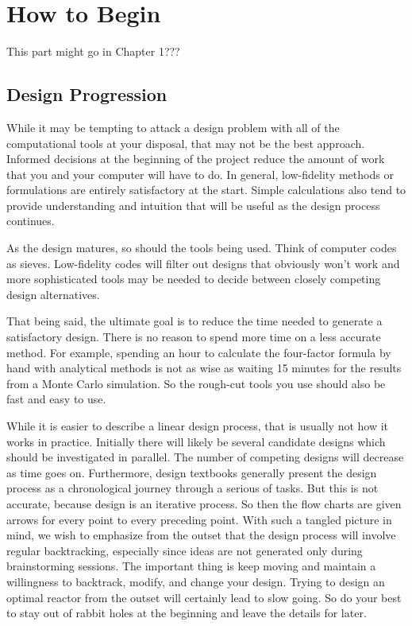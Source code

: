 \chapter{How to Begin}
This part might go in Chapter 1???

\section{Design Progression}
While it may be tempting to attack a design problem with all of the computational tools at your disposal, that may not be the best approach. Informed decisions at the beginning of the project reduce the amount of work that you and your computer will have to do. 
In general, low-fidelity methods or formulations are entirely satisfactory at the start. Simple calculations also tend to provide understanding and intuition that will be useful as the design process continues.

As the design matures, so should the tools being used. Think of computer codes as sieves. Low-fidelity codes will filter out designs that obviously won't work and more sophisticated tools may be needed to decide between closely competing design alternatives.

That being said, the ultimate goal is to reduce the time needed to generate a satisfactory design. There is no reason to spend more time on a less accurate method. For example, spending an hour to calculate the four-factor formula by hand with analytical methods is not as wise as waiting 15 minutes for the results from a Monte Carlo simulation. So the rough-cut tools you use should also be fast and easy to use.

While it is easier to describe a linear design process, that is usually not how it works in practice. Initially there will likely be several candidate designs which should be investigated in parallel. The number of competing designs will decrease as time goes on. 
Furthermore, design textbooks generally present the design process as a chronological journey through a serious of tasks. But this is not accurate, because design is an iterative process. So then the flow charts are given arrows for every point to every preceding point. 
With such a tangled picture in mind, we wish to emphasize from the outset that the design process will involve regular backtracking, especially since ideas are not generated only during brainstorming sessions.
The important thing is keep moving and maintain a willingness to backtrack, modify, and change your design. Trying to design an optimal reactor from the outset will certainly lead to slow going. So do your best to stay out of rabbit holes at the beginning and leave the details for later.

